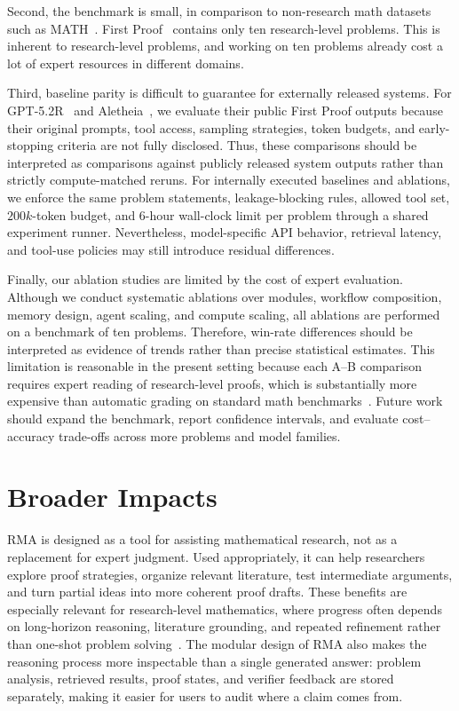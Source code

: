 \documentclass{article}
\newcommand{\modelname}{\textsc{RMA}\xspace}
\begin{document}
Second, the benchmark is small, in comparison to non-research math datasets such as MATH~\citep{hendrycks2021math}. First Proof~\citep{abouzaid2026first} contains only ten research-level problems. This is inherent to research-level problems, and working on ten problems already cost a lot of expert resources in different domains.

Third, baseline parity is difficult to guarantee for externally released systems. For GPT-5.2R~\citep{openai_first_proof_2025} and Aletheia~\citep{aletheia}, we evaluate their public First Proof outputs because their original prompts, tool access, sampling strategies, token budgets, and early-stopping criteria are not fully disclosed. Thus, these comparisons should be interpreted as comparisons against publicly released system outputs rather than strictly compute-matched reruns. For internally executed baselines and ablations, we enforce the same problem statements, leakage-blocking rules, allowed tool set, $200k$-token budget, and 6-hour wall-clock limit per problem through a shared experiment runner. Nevertheless, model-specific API behavior, retrieval latency, and tool-use policies may still introduce residual differences.

Finally, our ablation studies are limited by the cost of expert evaluation. Although we conduct systematic ablations over modules, workflow composition, memory design, agent scaling, and compute scaling, all ablations are performed on a benchmark of ten problems. Therefore, win-rate differences should be interpreted as evidence of trends rather than precise statistical estimates. This limitation is reasonable in the present setting because each A--B comparison requires expert reading of research-level proofs, which is substantially more expensive than automatic grading on standard math benchmarks~\citep{hendrycks2021math}. Future work should expand the benchmark, report confidence intervals, and evaluate cost--accuracy trade-offs across more problems and model families.

\section{Broader Impacts}
\label{app-broader-impacts}

\modelname is designed as a tool for assisting mathematical research, not as a replacement for expert judgment. Used appropriately, it can help researchers explore proof strategies, organize relevant literature, test intermediate arguments, and turn partial ideas into more coherent proof drafts. These benefits are especially relevant for research-level mathematics, where progress often depends on long-horizon reasoning, literature grounding, and repeated refinement rather than one-shot problem solving~\citep{abouzaid2026first,feng2026autonomousmathematicsresearch,zimmer2026agenticresearcherpracticalguide}. The modular design of \modelname also makes the reasoning process more inspectable than a single generated answer: problem analysis, retrieved results, proof states, and verifier feedback are stored separately, making it easier for users to audit where a claim comes from.
\end{document}
